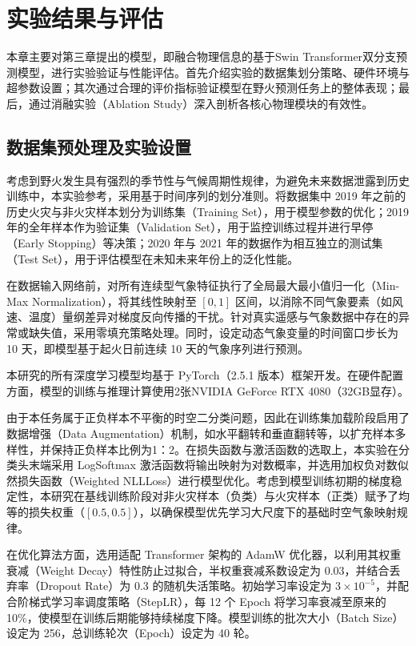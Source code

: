\chapter{实验结果与评估}
\label{chap:4}
本章主要对第三章提出的模型，即融合物理信息的基于Swin Transformer双分支预测模型，进行实验验证与性能评估。首先介绍实验的数据集划分策略、硬件环境与超参数设置；其次通过合理的评价指标验证模型在野火预测任务上的整体表现；最后，通过消融实验（Ablation Study）深入剖析各核心物理模块的有效性。
\section{数据集预处理及实验设置}
\label{sec:4-1}
考虑到野火发生具有强烈的季节性与气候周期性规律，为避免未来数据泄露到历史训练中，本实验参考\cite{loan}，采用基于时间序列的划分准则。将数据集中 2019 年之前的历史火灾与非火灾样本划分为训练集（Training Set），用于模型参数的优化；2019 年的全年样本作为验证集（Validation Set），用于监控训练过程并进行早停（Early Stopping）等决策；2020 年与 2021 年的数据作为相互独立的测试集（Test Set），用于评估模型在未知未来年份上的泛化性能。

在数据输入网络前，对所有连续型气象特征执行了全局最大最小值归一化（Min-Max Normalization），将其线性映射至 $[0, 1]$ 区间，以消除不同气象要素（如风速、温度）量纲差异对梯度反向传播的干扰。针对真实遥感与气象数据中存在的异常或缺失值，采用零填充策略处理。同时，设定动态气象变量的时间窗口步长为 10 天，即模型基于起火日前连续 10 天的气象序列进行预测。

本研究的所有深度学习模型均基于 PyTorch（2.5.1 版本）框架开发。在硬件配置方面，模型的训练与推理计算使用2张NVIDIA GeForce RTX 4080（32GB显存）。

由于本任务属于正负样本不平衡的时空二分类问题，因此在训练集加载阶段启用了数据增强（Data Augmentation）机制，如水平翻转和垂直翻转等，以扩充样本多样性，并保持正负样本比例为1：2\cite{loan}。在损失函数与激活函数的选取上，本实验在分类头末端采用 LogSoftmax 激活函数将输出映射为对数概率，并选用加权负对数似然损失函数（Weighted NLLLoss）进行模型优化。考虑到模型训练初期的梯度稳定性，本研究在基线训练阶段对非火灾样本（负类）与火灾样本（正类）赋予了均等的损失权重（$[0.5, 0.5]$），以确保模型优先学习大尺度下的基础时空气象映射规律。

在优化算法方面，选用适配 Transformer 架构的 AdamW 优化器，以利用其权重衰减（Weight Decay）特性防止过拟合，半权重衰减系数设定为 0.03，并结合丢弃率（Dropout Rate）为 0.3 的随机失活策略。初始学习率设定为 $3 \times 10^{-5}$，并配合阶梯式学习率调度策略（StepLR），每 12 个 Epoch 将学习率衰减至原来的 10\%，使模型在训练后期能够持续梯度下降。模型训练的批次大小（Batch Size）设定为 256，总训练轮次（Epoch）设定为 40 轮。

